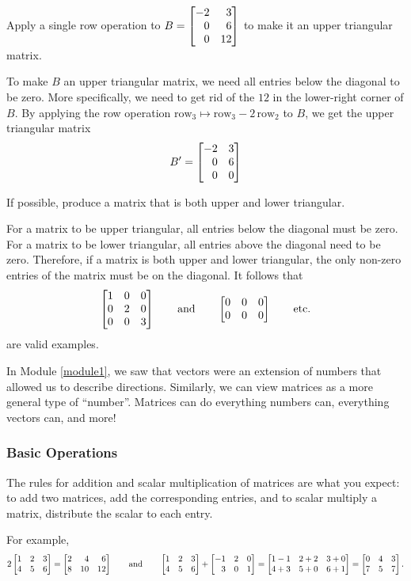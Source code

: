 \begin{example}Apply a single row operation to $B=\mat{-2&3\\0&6\\0&12}$
 to make it an upper triangular matrix.

	To make $B$ an upper triangular matrix, we need all entries below the diagonal to be zero.
	More specifically, we need to get rid of the $12$ in the lower-right corner of $B$. By applying the row
	operation $\text{row}_3\mapsto \text{row}_3-2\,\text{row}_2$ to $B$, we get the upper triangular matrix
	\[
		B'=\mat{-2&3\\0&6\\0&0}
	\]
\end{example}

\begin{example}If possible, produce a matrix that is both upper and lower triangular.

	For a matrix to be upper triangular, all entries below the diagonal must be zero. For a matrix
	to be lower triangular, all entries above the diagonal need to be zero. Therefore, if a matrix
	is both upper and lower triangular, the only non-zero entries of the matrix must be on the diagonal.
	It follows that
	\[\mat{1&0&0\\0&2&0\\0&0&3}\qquad\text{and}\qquad \mat{0&0&0\\0&0&0}\qquad\text{etc.}\]
	are valid examples.
\end{example}





In Module \ref{module1}, we saw that vectors were an extension of numbers that allowed us to describe directions.
Similarly, we can view matrices as a more general type of ``number''. Matrices can do everything numbers can,
everything vectors can, and more!

\subsubsection*{Basic Operations}

The rules for addition and scalar multiplication of matrices are what you expect: to add two matrices, add the corresponding entries,
and to scalar multiply a matrix, distribute the scalar to each entry.

For example,
\[
	2\mat{1&2&3\\4&5&6} = \mat{2&4&6\\8&10&12}\qquad\text{and}\qquad
	\mat{1&2&3\\4&5&6}+\mat{-1&2&0\\3&0&1} = 
	\mat{1-1&2+2&3+0\\4+3&5+0&6+1}
	=\mat{0 & 4 & 3\\7&5&7}.
\]

